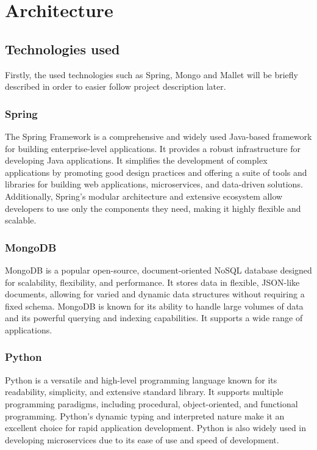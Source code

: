 \chapter{Architecture}\label{ch:met}

\section{Technologies used}
Firstly, the used technologies such as Spring, Mongo and Mallet will be briefly described in order
to easier follow project description later.
\subsection{Spring}
The Spring Framework is a comprehensive and widely used Java-based framework for building
enterprise-level applications. It provides a robust infrastructure for developing Java applications.
It simplifies the development of complex applications by promoting good design practices and
offering a suite of tools and libraries for building web applications, microservices, and
data-driven solutions. Additionally, Spring's modular architecture and extensive ecosystem
allow developers to use only the components they need, making it highly flexible and scalable.
\cite{spring}

\subsection{MongoDB}
MongoDB is a popular open-source, document-oriented NoSQL database designed for scalability,
flexibility, and performance. It stores data in flexible, JSON-like documents, allowing for varied
and dynamic data structures without requiring a fixed schema. MongoDB is known for its ability to handle large
volumes of data and its powerful querying and indexing capabilities. It supports a wide range of applications.
\cite{mongodb}

\subsection{Python}
Python is a versatile and high-level programming language known for its readability, simplicity, and extensive
standard library. It supports multiple programming paradigms, including procedural, object-oriented, and
functional programming. Python's dynamic typing and interpreted nature make it an excellent choice for rapid
application development. Python is also widely used in developing microservices due to its ease of use and
speed of development. \cite{python}

